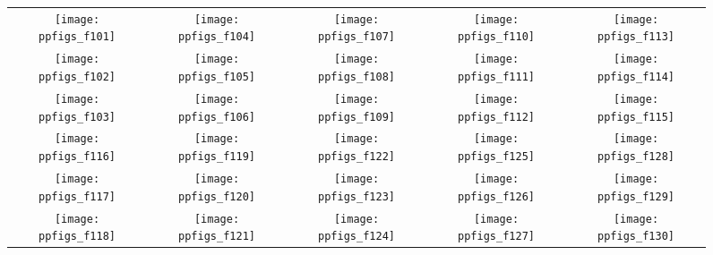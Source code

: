 \documentclass{sig-alternate}
\newcommand{\ERT}{\ensuremath{\mathrm{ERT}}}
\begin{document}
\begin{figure*}
\centering
\begin{tabular}{@{}c@{}c@{}c@{}c@{}c@{}}
\texttt{[image: ppfigs\_f101]}&
\texttt{[image: ppfigs\_f104]}&
\texttt{[image: ppfigs\_f107]}&
\texttt{[image: ppfigs\_f110]}&
\texttt{[image: ppfigs\_f113]}\\
\texttt{[image: ppfigs\_f102]}&
\texttt{[image: ppfigs\_f105]}&
\texttt{[image: ppfigs\_f108]}&
\texttt{[image: ppfigs\_f111]}&
\texttt{[image: ppfigs\_f114]}\\
\texttt{[image: ppfigs\_f103]}&
\texttt{[image: ppfigs\_f106]}&
\texttt{[image: ppfigs\_f109]}&
\texttt{[image: ppfigs\_f112]}&
\texttt{[image: ppfigs\_f115]}\\
\texttt{[image: ppfigs\_f116]}&
\texttt{[image: ppfigs\_f119]}&
\texttt{[image: ppfigs\_f122]}&
\texttt{[image: ppfigs\_f125]}&
\texttt{[image: ppfigs\_f128]}\\
\texttt{[image: ppfigs\_f117]}&
\texttt{[image: ppfigs\_f120]}&
\texttt{[image: ppfigs\_f123]}&
\texttt{[image: ppfigs\_f126]}&
\texttt{[image: ppfigs\_f129]}\\
\texttt{[image: ppfigs\_f118]}&
\texttt{[image: ppfigs\_f121]}&
\texttt{[image: ppfigs\_f124]}&
\texttt{[image: ppfigs\_f127]}&
\texttt{[image: ppfigs\_f130]}
\end{tabular}
\caption[Expected running time (\ERT) divided by dimension
versus dimension in log-log presentation]{\label{fig:scaling}%
}
\end{figure*}
\end{document}
